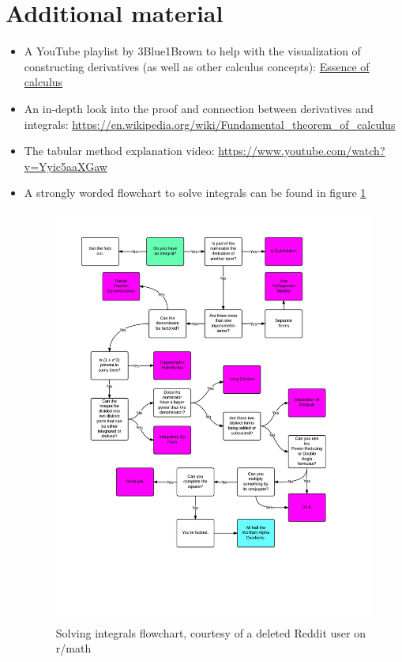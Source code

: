 \section{Additional material}\label{sec:m-integral-material}
\begin{itemize}
    \item A YouTube playlist by 3Blue1Brown to help with the visualization of constructing derivatives (as well as other calculus concepts): \href{https://www.youtube.com/playlist?list=PL0-GT3co4r2wlh6UHTUeQsrf3mlS2lk6x}{Essence of calculus}
    \item An in-depth look into the proof and connection between derivatives and integrals: \url{https://en.wikipedia.org/wiki/Fundamental_theorem_of_calculus}
    \item The tabular method explanation video: \url{https://www.youtube.com/watch?v=Yyic5aaXGaw}
    \item A strongly worded flowchart to solve integrals can be found in figure \ref{fig:m18}
\begin{figure}
    \centering
    \includegraphics[width=1\linewidth]{math/18.png}
    \caption{Solving integrals flowchart, courtesy of a deleted Reddit user on r/math}
    \label{fig:m18}
\end{figure}
\end{itemize}